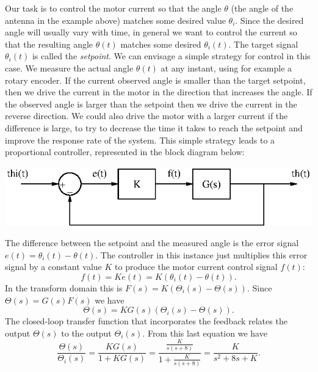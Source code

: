 \documentclass[10pt]{beamer}
\begin{document}
Our task is to control the motor current so that the angle $\theta$ (the angle of the antenna in the example above) matches some desired value $\theta_i$.  Since the desired angle will usually vary with time, in general we want to control the current so that the resulting angle $\theta(t)$ matches some desired $\theta_i(t)$.  The target signal $\theta_i(t)$ is called the {\em setpoint}.  We can envisage a simple strategy for control in this case.  We measure the actual angle $\theta(t)$ at any instant, using for example a rotary encoder.  If the current observed angle is smaller than the target setpoint, then we drive the current in the motor in the direction that increases the angle.  If the observed angle is larger than the setpoint then we drive the current in the reverse direction.  We could also drive the motor with a larger current if the difference is large, to try to decrease the time it takes to reach the setpoint and improve the response rate of the system.  This simple strategy leads to a proportional controller, represented in the block diagram below:
\begin{center}
  \includegraphics{propcontroller}
\end{center}
The difference between the setpoint and the measured angle is the error signal $e(t) = \theta_i(t) - \theta(t)$.  The controller in this instance just multiplies this error signal by a constant value $K$ to produce the motor current control signal $f(t)$:
\begin{equation*}
  f(t) = K e(t) = K (\theta_i(t) - \theta(t)).
\end{equation*}
In the transform domain this is $F(s) = K ( \Theta_i(s) - \Theta(s) )$.  Since $\Theta(s) = G(s) F(s)$ we have
\begin{equation*}
  \Theta(s) = K G(s) ( \Theta_i(s) - \Theta(s) ).
\end{equation*}
The closed-loop transfer function that incorporates the feedback relates the output $\Theta(s)$ to the output $\Theta_i(s)$.  From this last equation we have
\begin{equation*}
  \frac{\Theta(s)}{\Theta_i(s)} = \frac{K G(s)}{1 + K G(s)} = \frac{\frac{K}{s(s+8)}}{1 + \frac{K}{s(s+8)}}
  = \frac{K}{s^2 + 8s + K}.
\end{equation*}
\end{document}

